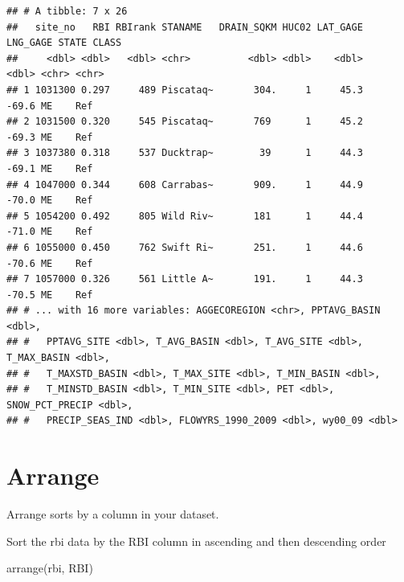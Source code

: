 \documentclass[
]{book}
\newenvironment{Shaded}{\begin{snugshade}}{\end{snugshade}}
\newcommand{\FunctionTok}[1]{\textcolor[rgb]{0.00,0.00,0.00}{#1}}
\newcommand{\NormalTok}[1]{#1}
\begin{document}
\begin{verbatim}
## # A tibble: 7 x 26
##   site_no   RBI RBIrank STANAME   DRAIN_SQKM HUC02 LAT_GAGE LNG_GAGE STATE CLASS
##     <dbl> <dbl>   <dbl> <chr>          <dbl> <dbl>    <dbl>    <dbl> <chr> <chr>
## 1 1031300 0.297     489 Piscataq~       304.     1     45.3    -69.6 ME    Ref  
## 2 1031500 0.320     545 Piscataq~       769      1     45.2    -69.3 ME    Ref  
## 3 1037380 0.318     537 Ducktrap~        39      1     44.3    -69.1 ME    Ref  
## 4 1047000 0.344     608 Carrabas~       909.     1     44.9    -70.0 ME    Ref  
## 5 1054200 0.492     805 Wild Riv~       181      1     44.4    -71.0 ME    Ref  
## 6 1055000 0.450     762 Swift Ri~       251.     1     44.6    -70.6 ME    Ref  
## 7 1057000 0.326     561 Little A~       191.     1     44.3    -70.5 ME    Ref  
## # ... with 16 more variables: AGGECOREGION <chr>, PPTAVG_BASIN <dbl>,
## #   PPTAVG_SITE <dbl>, T_AVG_BASIN <dbl>, T_AVG_SITE <dbl>, T_MAX_BASIN <dbl>,
## #   T_MAXSTD_BASIN <dbl>, T_MAX_SITE <dbl>, T_MIN_BASIN <dbl>,
## #   T_MINSTD_BASIN <dbl>, T_MIN_SITE <dbl>, PET <dbl>, SNOW_PCT_PRECIP <dbl>,
## #   PRECIP_SEAS_IND <dbl>, FLOWYRS_1990_2009 <dbl>, wy00_09 <dbl>
\end{verbatim}

\hypertarget{arrange}{%
\section{Arrange}\label{arrange}}

Arrange sorts by a column in your dataset.

Sort the rbi data by the RBI column in ascending and then descending order

\begin{Shaded}
\begin{Highlighting}[]
\FunctionTok{arrange}\NormalTok{(rbi, RBI)}
\end{Highlighting}
\end{Shaded}
\end{document}
